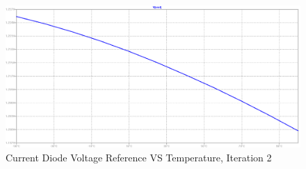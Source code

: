 \documentclass[conference]{IEEEtran}
\begin{document}
\begin{figure}[!htbp]
  	\centering
  	\includegraphics[scale=0.35]{images/cm-diode-vref-2.png}
  	\caption[cm-diode-vref-2]{Current Diode Voltage Reference VS Temperature, Iteration 2}
  	\label{fig:cm-diode-vref-2}
	\end{figure}
\end{document}
